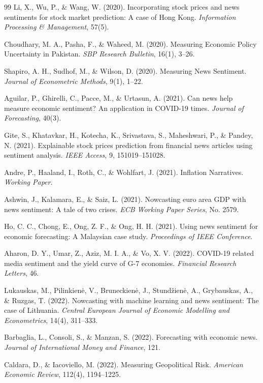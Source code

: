 \documentclass[11pt]{article}
\begin{document}
\begin{thebibliography}{99}
 Li, X., Wu, P., \& Wang, W. (2020). Incorporating stock prices and news sentiments for stock market prediction: A case of Hong Kong. \textit{Information Processing \& Management}, 57(5).

 Choudhary, M. A., Pasha, F., \& Waheed, M. (2020). Measuring Economic Policy Uncertainty in Pakistan. \textit{SBP Research Bulletin}, 16(1), 3--26.

 Shapiro, A. H., Sudhof, M., \& Wilson, D. (2020). Measuring News Sentiment. \textit{Journal of Econometric Methods}, 9(1), 1--22.

 Aguilar, P., Ghirelli, C., Pacce, M., \& Urtasun, A. (2021). Can news help measure economic sentiment? An application in COVID-19 times. \textit{Journal of Forecasting}, 40(3).

 Gite, S., Khatavkar, H., Kotecha, K., Srivastava, S., Maheshwari, P., \& Pandey, N. (2021). Explainable stock prices prediction from financial news articles using sentiment analysis. \textit{IEEE Access}, 9, 151019--151028.

 Andre, P., Haaland, I., Roth, C., \& Wohlfart, J. (2021). Inflation Narratives. \textit{Working Paper}.

 Ashwin, J., Kalamara, E., \& Saiz, L. (2021). Nowcasting euro area GDP with news sentiment: A tale of two crises. \textit{ECB Working Paper Series}, No. 2579.

 Ho, C. C., Chong, E., Ong, Z. F., \& Ong, H. H. (2021). Using news sentiment for economic forecasting: A Malaysian case study. \textit{Proceedings of IEEE Conference}.

 Aharon, D. Y., Umar, Z., Aziz, M. I. A., \& Vo, X. V. (2022). COVID-19 related media sentiment and the yield curve of G-7 economies. \textit{Financial Research Letters}, 46.

 Lukauskas, M., Pilinkienė, V., Bruneckienė, J., Stundžienė, A., Grybauskas, A., \& Ruzgas, T. (2022). Nowcasting with machine learning and news sentiment: The case of Lithuania. \textit{Central European Journal of Economic Modelling and Econometrics}, 14(4), 311--333.

 Barbaglia, L., Consoli, S., \& Manzan, S. (2022). Forecasting with economic news. \textit{Journal of International Money and Finance}, 121.

 Caldara, D., \& Iacoviello, M. (2022). Measuring Geopolitical Risk. \textit{American Economic Review}, 112(4), 1194--1225.


\end{thebibliography}
\end{document}

